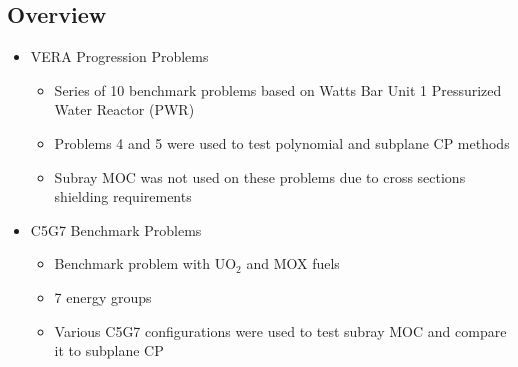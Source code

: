 \subsection{Overview}
\begin{frame}
    
    \begin{itemize}
        \item VERA Progression Problems \cite{VERAProgressionProblems}
        \begin{itemize}
            \item Series of 10 benchmark problems based on Watts Bar Unit 1 Pressurized Water Reactor (PWR)
            \item Problems 4 and 5 were used to test polynomial and subplane CP methods
            \item Subray MOC was not used on these problems due to cross sections shielding requirements
        \end{itemize}
        \item C5G7 Benchmark Problems \cite{EELewisC5G72003,EELewisC5G7extended2005}
        \begin{itemize}
            \item Benchmark problem with UO$_2$ and MOX fuels
            \item 7 energy groups
            \item Various C5G7 configurations were used to test subray MOC and compare it to subplane CP
        \end{itemize}
    \end{itemize}

\end{frame}


